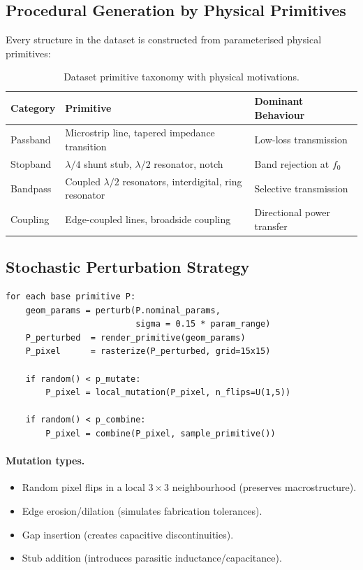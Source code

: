 \documentclass[12pt,a4paper]{article}
\theoremstyle{definition}
\theoremstyle{plain}
\theoremstyle{remark}
\begin{document}
\subsection{Procedural Generation by Physical Primitives}

Every structure in the dataset is constructed from parameterised physical primitives:

\begin{table}[H]
\centering
\caption{Dataset primitive taxonomy with physical motivations.}
\label{tab:dataset_primitives}
\begin{tabularx}{\linewidth}{lXl}
\toprule
\textbf{Category} & \textbf{Primitive} & \textbf{Dominant Behaviour} \\
\midrule
Passband  & Microstrip line, tapered impedance transition & Low-loss transmission \\
Stopband  & $\lambda/4$ shunt stub, $\lambda/2$ resonator, notch & Band rejection at $f_0$ \\
Bandpass  & Coupled $\lambda/2$ resonators, interdigital, ring resonator & Selective transmission \\
Coupling  & Edge-coupled lines, broadside coupling & Directional power transfer \\
\bottomrule
\end{tabularx}
\end{table}

\subsection{Stochastic Perturbation Strategy}
\label{sec:perturbation}

\begin{lstlisting}[caption={Pseudocode for procedural dataset generation.}]
for each base primitive P:
    geom_params = perturb(P.nominal_params,
                          sigma = 0.15 * param_range)
    P_perturbed  = render_primitive(geom_params)
    P_pixel      = rasterize(P_perturbed, grid=15x15)

    if random() < p_mutate:
        P_pixel = local_mutation(P_pixel, n_flips=U(1,5))

    if random() < p_combine:
        P_pixel = combine(P_pixel, sample_primitive())
\end{lstlisting}

\paragraph{Mutation types.}
\begin{itemize}
  \item Random pixel flips in a local $3\times3$ neighbourhood (preserves macrostructure).
  \item Edge erosion/dilation (simulates fabrication tolerances).
  \item Gap insertion (creates capacitive discontinuities).
  \item Stub addition (introduces parasitic inductance/capacitance).
\end{itemize}
\end{document}
